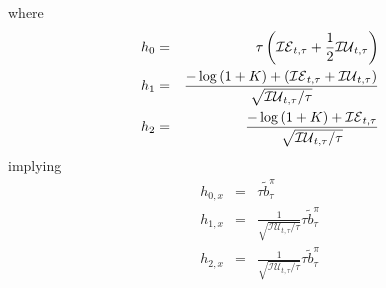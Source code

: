 \documentclass{article}
\begin{document}
where%
\begin{eqnarray*}
h_{0} &=&\tau \left( \mathcal{IE}_{t,\tau }+\frac{1}{2}\mathcal{IU}_{t,\tau
}\right)  \\
h_{1} &=&\frac{-\log \left( 1+K\right) +\left( \mathcal{IE}_{t,\tau }+%
\mathcal{IU}_{t,\tau }\right) }{\sqrt{\mathcal{IU}_{t,\tau }/\tau }} \\
h_{2} &=&\frac{-\log \left( 1+K\right) +\mathcal{IE}_{t,\tau }}{\sqrt{%
\mathcal{IU}_{t,\tau }/\tau }}
\end{eqnarray*}%
implying%
\begin{eqnarray*}
h_{0,x} &=&\tau \tilde{b}_{\tau }^{\pi } \\
h_{1,x} &=&\frac{1}{\sqrt{\mathcal{IU}_{t,\tau }/\tau }}\tau \tilde{b}_{\tau
}^{\pi } \\
h_{2,x} &=&\frac{1}{\sqrt{\mathcal{IU}_{t,\tau }/\tau }}\tau \tilde{b}_{\tau
}^{\pi }
\end{eqnarray*}
\end{document}
